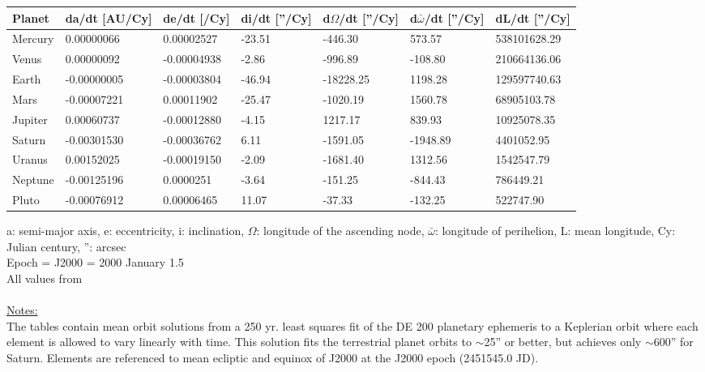 \documentclass[Orbiter User Manual.tex]{subfiles}
\begin{document}
	\begin{longtable}{ |p{}|p{}|p{}|p{}|p{}|p{}|p{}| }
	\hline\rule{0pt}{2ex}
	\textbf{Planet} & \textbf{da/dt [AU/Cy]} & \textbf{de/dt [/Cy]} & \textbf{di/dt [''/Cy]} & \textbf{d$\Omega$/dt [''/Cy]} & \textbf{d$\bar{\omega}$/dt [''/Cy]} & \textbf{dL/dt [''/Cy]}\\
	\hline\rule{0pt}{2ex}
	Mercury & 0.00000066 & 0.00002527 & -23.51 & -446.30 & 573.57 & 538101628.29\\
	\hline\rule{0pt}{2ex}
	Venus & 0.00000092 & -0.00004938 & -2.86 & -996.89 & -108.80 & 210664136.06\\
	\hline\rule{0pt}{2ex}
	Earth & -0.00000005 & -0.00003804 & -46.94 & -18228.25 & 1198.28 & 129597740.63\\
	\hline\rule{0pt}{2ex}
	Mars & -0.00007221 & 0.00011902 & -25.47 & -1020.19 & 1560.78 & 68905103.78\\
	\hline\rule{0pt}{2ex}
	Jupiter & 0.00060737 & -0.00012880 & -4.15 & 1217.17 & 839.93 & 10925078.35 \\
	\hline\rule{0pt}{2ex}
	Saturn & -0.00301530 & -0.00036762 & 6.11 & -1591.05 & -1948.89 & 4401052.95\\
	\hline\rule{0pt}{2ex}
	Uranus & 0.00152025 & -0.00019150 & -2.09 & -1681.40 & 1312.56 & 1542547.79\\
	\hline\rule{0pt}{2ex}
	Neptune & -0.00125196 & 0.0000251 & -3.64 & -151.25 & -844.43 & 786449.21\\
	\hline\rule{0pt}{2ex}
	Pluto & -0.00076912 & 0.00006465 & 11.07 & -37.33 & -132.25 & 522747.90\\
	\hline
	\end{longtable}

\noindent
a: semi-major axis, e: eccentricity, i: inclination, $\Omega$: longitude of the ascending node, $\bar{\omega}$: longitude of perihelion, L: mean longitude, Cy: Julian century, '': arcsec\\
Epoch = J2000 = 2000 January 1.5\\
All values from \cite{seidelmann1992p316}\\
\\
\underline{Notes:}\\
The tables contain mean orbit solutions from a 250 yr. least squares fit of the DE 200 planetary ephemeris to a Keplerian orbit where each element is allowed to vary linearly with time. This solution fits the terrestrial planet orbits to $\sim$25'' or better, but achieves only $\sim$600'' for Saturn. Elements are referenced to mean ecliptic and equinox of J2000 at the J2000 epoch (2451545.0 JD).
\end{document}
